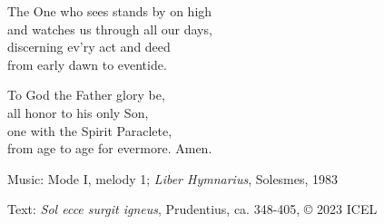 \hymn



\begin{underhymnverse}
The One who sees stands by on high\\
and watches us through all our days,\\
discerning ev’ry act and deed\\
from early dawn to eventide.

To God the Father glory be,\\
all honor to his only Son,\\
one with the Spirit Paraclete,\\
from age to age for evermore. Amen.
\end{underhymnverse}

\begin{hymnsource}
Music: Mode I, melody 1; \emph{Liber Hymnarius}, Solesmes, 1983

Text: \emph{Sol ecce surgit igneus}, Prudentius, ca. 348-405, © 2023 ICEL
\end{hymnsource}
